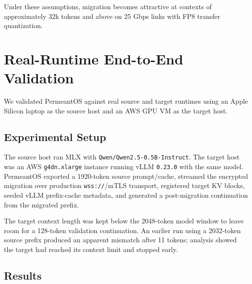 \documentclass[11pt]{article}
\begin{document}
Under these assumptions, migration becomes attractive at contexts of approximately 32k tokens and above on 25 Gbps links with FP8 transfer quantization.

\section{Real-Runtime End-to-End Validation}

We validated PermeantOS against real source and target runtimes using an Apple Silicon laptop as the source host and an AWS GPU VM as the target host.

\subsection{Experimental Setup}

The source host ran MLX with \texttt{Qwen/Qwen2.5-0.5B-Instruct}. The target host was an AWS \texttt{g4dn.xlarge} instance running vLLM \texttt{0.23.0} with the same model. PermeantOS exported a 1920-token source prompt/cache, streamed the encrypted migration over production \texttt{wss://}/mTLS transport, registered target KV blocks, seeded vLLM prefix-cache metadata, and generated a post-migration continuation from the migrated prefix.

The target context length was kept below the 2048-token model window to leave room for a 128-token validation continuation. An earlier run using a 2032-token source prefix produced an apparent mismatch after 11 tokens; analysis showed the target had reached its context limit and stopped early.

\subsection{Results}
\end{document}
